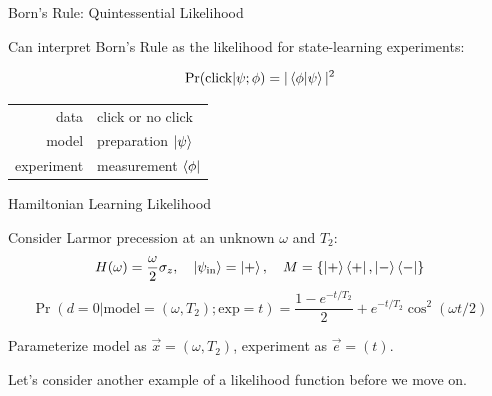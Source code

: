 \documentclass[xcolor=dvipsnames, compress]{beamer}
\begin{document}
\begin{frame}{Born's Rule: Quintessential Likelihood}

    Can interpret Born's Rule as the likelihood for state-learning experiments:

    $$
      \Pr(\text{click} | \psi; \phi) = | \braket{\phi | \psi} |^2
    $$

    \pause

    \begin{center}
        \begin{tabular}{r|l}
                  data & click or no click \\
                 model & preparation $\ket{\psi}$ \\
            experiment & measurement $\bra{\phi}$
        \end{tabular}
    \end{center}

\end{frame}

\begin{frame}{Hamiltonian Learning Likelihood}
  
    Consider Larmor precession at an unknown $\omega$ and $T_2$:
    \begin{equation*}
      H(\omega) = \frac{\omega}{2} \sigma_z,\quad\ket{\psi_\text{in}} = \ket{+},\quad M = \{\ket{+}\bra{+}, \ket{-}\bra{-}\}
    \end{equation*}
    \begin{equation*}
          \Pr(d = 0 | \text{model} = (\omega, T_2); \text{exp} = t) =  \frac{1 - e^{-t / T_2}}{2} + e^{-t / T_2} \cos^2(\omega t / 2)
    \end{equation*}

    \pause

    Parameterize model as $\vec{x} = (\omega, T_2)$, experiment as $\vec{e} = (t)$.

\end{frame}


\begin{frame}

  Let's consider another example of a likelihood function
  before we move on.

\end{frame}
\end{document}
